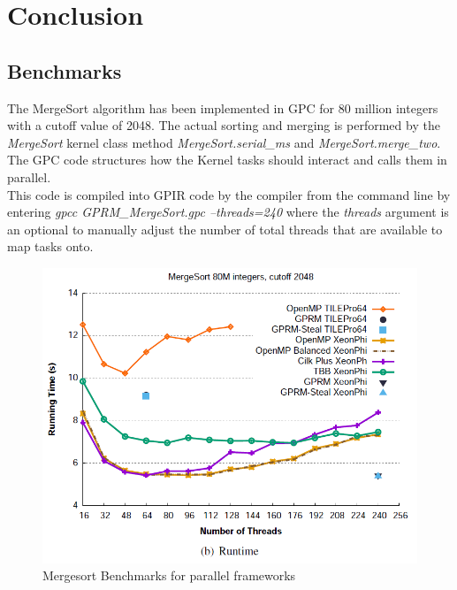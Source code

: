 \chapter{Conclusion}

\section{Benchmarks}

The MergeSort algorithm has been implemented in GPC for 80 million integers with a cutoff value 
of 2048. The actual sorting and merging is performed by the \textit{MergeSort} kernel class
method \textit{MergeSort.serial\_ms} and \textit{MergeSort.merge\_two}. The GPC code structures
how the Kernel tasks should interact and calls them in parallel.\\ 



This code is compiled into GPIR code by the compiler from the command line by entering \textit{gpcc GPRM\_MergeSort.gpc --threads=240}
where the \textit{threads} argument is an optional to manually adjust the number of total threads that are available
to map tasks onto.

\newpage

\begin{figure}[!htb]
\includegraphics{graphs/benchmark.png}
\caption{Mergesort Benchmarks for parallel frameworks \cite{GPRMBench}}
\label{fig:bench}
\end{figure}

